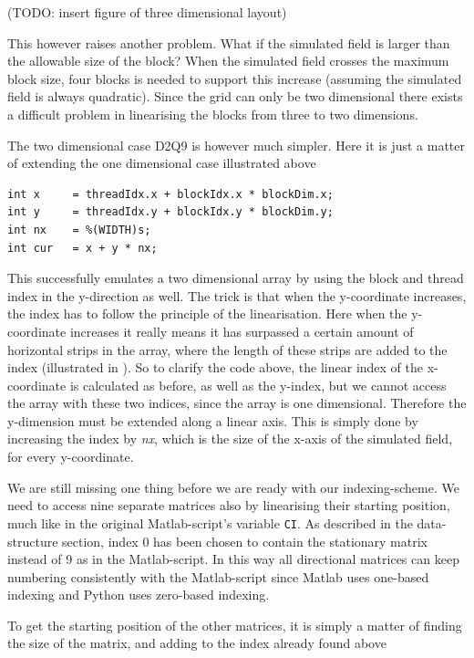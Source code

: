 (TODO: insert figure of three dimensional layout)

This however raises another problem. What if the simulated field is larger than the allowable size of the block? When the simulated field crosses the maximum block size, four blocks is needed to support this increase (assuming the simulated field is always quadratic). Since the grid can only be two dimensional there exists a difficult problem in linearising the blocks from three to two dimensions.

The two dimensional case D2Q9 is however much simpler. Here it is just a matter of extending the one dimensional case illustrated above

\begin{verbatim}
int x     = threadIdx.x + blockIdx.x * blockDim.x;
int y     = threadIdx.y + blockIdx.y * blockDim.y;
int nx    = %(WIDTH)s;
int cur   = x + y * nx;
\end{verbatim}

This successfully emulates a two dimensional array by using the block and thread index in the y-direction as well. The trick is that when the y-coordinate increases, the index has to follow the principle of the linearisation. Here when the y-coordinate increases it really means it has surpassed a certain amount of horizontal strips in the array, where the length of these strips are added to the index (illustrated in ). So to clarify the code above, the linear index of the x-coordinate is calculated as before, as well as the y-index, but we cannot access the array with these two indices, since the array is one dimensional. Therefore the y-dimension must be extended along a linear axis. This is simply done by increasing the index by \textit{nx}, which is the size of the x-axis of the simulated field, for every y-coordinate.

We are still missing one thing before we are ready with our indexing-scheme. We need to access nine separate matrices also by linearising their starting position, much like in the original Matlab-script's variable \texttt{CI}. As described in the data-structure section, index 0 has been chosen to contain the stationary matrix instead of 9 as in the Matlab-script. In this way all directional matrices can keep numbering consistently with the Matlab-script since Matlab uses one-based indexing and Python uses zero-based indexing.

To get the starting position of the other matrices, it is simply a matter of finding the size of the matrix, and adding to the index already found above

